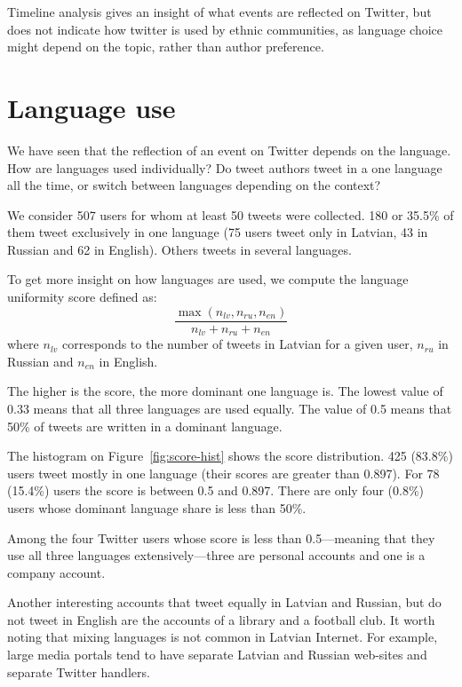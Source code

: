 \documentclass[11pt,a4paper]{article}
\begin{document}

Timeline analysis gives an insight of what events are reflected on Twitter, but does not indicate how twitter is used by ethnic communities, as language choice might depend on the topic, rather than author preference.

\section{Language use}
\label{sec:lang-use}

We have seen that the reflection of an event on Twitter depends on the language. How are languages used individually? Do tweet authors tweet in a one language all the time, or switch between languages depending on the context?

We consider 507 users for whom at least 50 tweets were collected. 180 or 35.5\% of them tweet exclusively in one language (75 users tweet only in Latvian, 43 in Russian and 62 in English). Others tweets in several languages.

To get more insight on how languages are used, we compute the language uniformity score defined as:
\begin{equation}
  \label{eq:score}
  \frac{\max(n_\mathit{lv}, n_\mathit{ru}, n_\mathit{en})}{n_\mathit{lv} + n_\mathit{ru} + n_\mathit{en}}
\end{equation}
where $n_\mathit{lv}$ corresponds to the number of tweets in Latvian for a given user, $n_\mathit{ru}$ in Russian and $n_\mathit{en}$ in English.

The higher is the score, the more dominant one language is. The lowest value of 0.33 means that all three languages are used equally. The value of 0.5 means that 50\% of tweets are written in a dominant language.

The histogram on Figure~\ref{fig:score-hist} shows the score distribution. 425 (83.8\%) users tweet mostly in one language (their scores are greater than 0.897). For 78  (15.4\%) users the score is between 0.5 and 0.897. There are only four (0.8\%) users whose dominant language share is less than 50\%.

Among the four Twitter users whose score is less than 0.5---meaning that they use all three languages extensively---three are personal accounts and one is a company account.

Another interesting accounts that tweet equally in Latvian and Russian, but do not tweet in English are the accounts of a library and a football club. It worth noting that mixing languages is not common in Latvian Internet. For example, large media portals tend to have separate Latvian and Russian web-sites and separate Twitter handlers.
\end{document}
